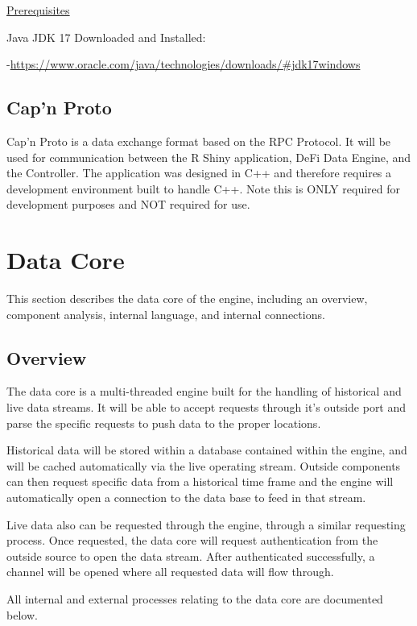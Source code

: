\documentclass{article}
\begin{document}
\underline{Prerequisites}

\begin{framed} 
Java JDK 17 Downloaded and Installed: 

-\;\href{https://www.oracle.com/java/technologies/downloads/#jdk17-windows}{https://www.oracle.com/java/technologies/downloads/\#jdk17\-windows}
\end{framed}

\subsection{Cap'n Proto}
Cap'n Proto is a data exchange format based on the RPC Protocol. It will be used for communication between the R Shiny application, DeFi Data Engine, and the Controller. The application was designed in C++ and therefore requires a development environment built to handle C++. Note this is ONLY required for development purposes and NOT required for use.


\cleardoublepage
\section{Data Core}
This section describes the data core of the engine, including an overview, component analysis, internal language, and internal connections.

\subsection{Overview}
The data core is a multi-threaded engine built for the handling of historical and live data streams. It will be able to accept requests through it's outside port and parse the specific requests to push data to the proper locations. 

Historical data will be stored within a database contained within the engine, and will be cached automatically via the live operating stream. Outside components can then request specific data from a historical time frame and the engine will automatically open a connection to the data base to feed in that stream.

Live data also can be requested through the engine, through a similar requesting process. Once requested, the data core will request authentication from the outside source to open the data stream. After authenticated successfully, a channel will be opened where all requested data will flow through.

All internal and external processes relating to the data core are documented below.
\end{document}
